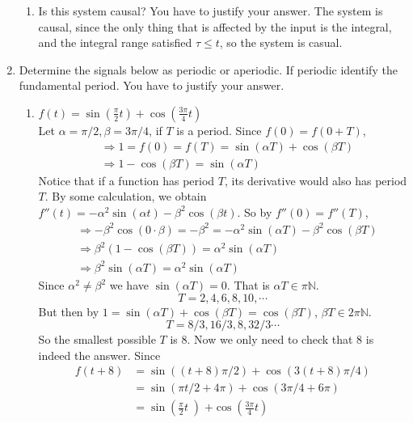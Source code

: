 \documentclass[12pt, a4paper]{article}
\begin{document}
\begin{enumerate}
\begin{enumerate}
      \item Is this system causal? You have to justify your answer.
        The system is causal, since the only thing that is affected by the input is the integral,
        and the integral range satisfied $\tau \leq t$, so the system is casual.
    \end{enumerate}
  \item Determine the signals below as periodic or aperiodic. If periodic identify the 
        fundamental period. You have to justify your answer.
    \begin{enumerate}
      \item $f(t) = \sin(\frac{\pi}{2} t) + \cos(\frac{3\pi}{4} t)$ \\[12pt]
        Let $\alpha = \pi / 2, \beta = 3 \pi / 4$, if $T$ is a period. 
        Since $f(0) = f(0+T) $,
        \begin{align*}
          &\Rightarrow 1 = f(0) = f(T) = \sin(\alpha T) + \cos(\beta T) \\
          &\Rightarrow 1 - \cos(\beta T) = \sin(\alpha T) 
        \end{align*}
        Notice that if a function has period $T$, its derivative would also has period $T$.
        By some calculation, we obtain $f''(t) = -\alpha^2 \sin(\alpha t) - \beta^2 \cos(\beta t)$.
        So by $f''(0) = f''(T) $, 
        \begin{align*} & \Rightarrow -\beta^2 \cos(0 \cdot \beta) = -\beta^2 =
          -\alpha^2 \sin(\alpha T) - \beta^2 \cos(\beta T) \\
          & \Rightarrow \beta^2 ( 1 - \cos(\beta T)) = \alpha^2 \sin(\alpha T) \\
          & \Rightarrow \beta^2 \sin(\alpha T) = \alpha^2 \sin(\alpha T)
        \end{align*}
        Since $\alpha^2 \neq \beta^2$ we have $\sin(\alpha T) = 0$. That is $\alpha T \in \pi \mathbb{N}$.
        \[ T = 2, 4, 6, 8, 10, \cdots \]
        But then by $1 = \sin(\alpha T) + \cos(\beta T) = \cos(\beta T)$, $\beta T \in 2\pi \mathbb{N}$.
        \[ T = 8/3, 16/3, 8, 32/3 \cdots \]
        So the smallest possible $T$ is $8$. Now we only need to check that $8$ is indeed the answer.
        Since 
        \begin{align*}
          f(t+8) &= \sin( (t + 8) \pi/2) + \cos(3 (t + 8) \pi/4) \\ 
                 &= \sin(\pi t/2 + 4\pi) + \cos(3 \pi/4 + 6 \pi)  \\
                 &=  \sin \left(\frac{\pi}{2} t \left) + \cos \left( \frac{3\pi}{4} t \right) \\

\end{align*}
\end{enumerate}
\end{enumerate}
\end{document}
